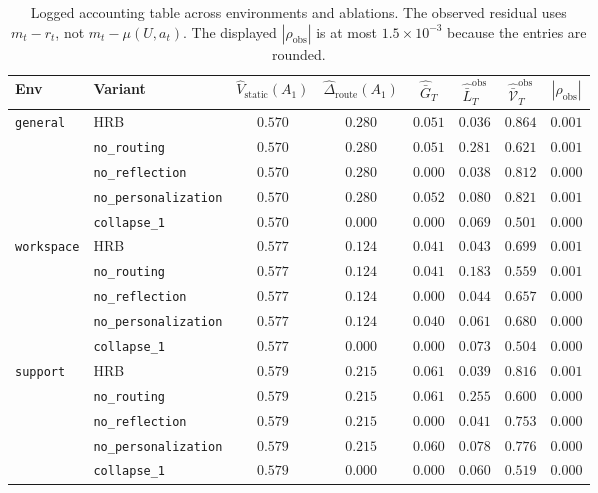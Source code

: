 \documentclass{article} %
\begin{document}
\begin{table}[h]
\centering
\small
\setlength{\tabcolsep}{4pt}
\begin{tabular}{llcccccc}
\toprule
Env & Variant & $\widehat V_{\mathrm{static}}(A_1)$ & $\widehat\Delta_{\mathrm{route}}(A_1)$ & $\widehat{\bar G}_T$ & $\widehat{\bar L}_T^{\mathrm{obs}}$ & $\widehat{\bar{\mathcal V}}_T^{\mathrm{obs}}$ & $|\rho_{\mathrm{obs}}|$ \\
\midrule
\multirow{5}{*}{\texttt{general}}
 & \textnormal{HRB}                & $0.570$ & $0.280$ & $0.051$ & $0.036$ & $0.864$ & $0.001$ \\
 & \texttt{no\_routing}         & $0.570$ & $0.280$ & $0.051$ & $0.281$ & $0.621$ & $0.001$ \\
 & \texttt{no\_reflection}      & $0.570$ & $0.280$ & $0.000$ & $0.038$ & $0.812$ & $0.000$ \\
 & \texttt{no\_personalization} & $0.570$ & $0.280$ & $0.052$ & $0.080$ & $0.821$ & $0.001$ \\
 & \texttt{collapse\_1}         & $0.570$ & $0.000$ & $0.000$ & $0.069$ & $0.501$ & $0.000$ \\
\midrule
\multirow{5}{*}{\texttt{workspace}}
 & \textnormal{HRB}                & $0.577$ & $0.124$ & $0.041$ & $0.043$ & $0.699$ & $0.001$ \\
 & \texttt{no\_routing}         & $0.577$ & $0.124$ & $0.041$ & $0.183$ & $0.559$ & $0.001$ \\
 & \texttt{no\_reflection}      & $0.577$ & $0.124$ & $0.000$ & $0.044$ & $0.657$ & $0.000$ \\
 & \texttt{no\_personalization} & $0.577$ & $0.124$ & $0.040$ & $0.061$ & $0.680$ & $0.000$ \\
 & \texttt{collapse\_1}         & $0.577$ & $0.000$ & $0.000$ & $0.073$ & $0.504$ & $0.000$ \\
\midrule
\multirow{5}{*}{\texttt{support}}
 & \textnormal{HRB}                & $0.579$ & $0.215$ & $0.061$ & $0.039$ & $0.816$ & $0.001$ \\
 & \texttt{no\_routing}         & $0.579$ & $0.215$ & $0.061$ & $0.255$ & $0.600$ & $0.000$ \\
 & \texttt{no\_reflection}      & $0.579$ & $0.215$ & $0.000$ & $0.041$ & $0.753$ & $0.000$ \\
 & \texttt{no\_personalization} & $0.579$ & $0.215$ & $0.060$ & $0.078$ & $0.776$ & $0.000$ \\
 & \texttt{collapse\_1}         & $0.579$ & $0.000$ & $0.000$ & $0.060$ & $0.519$ & $0.000$ \\
\bottomrule
\end{tabular}
\caption{Logged accounting table across environments and ablations. The
observed residual uses \(m_t-r_t\), not \(m_t-\mu(U,a_t)\). The displayed
\(|\rho_{\mathrm{obs}}|\) is at most \(1.5\times10^{-3}\) because the entries
are rounded.}
\label{tab:app-decomp-full}
\end{table}
\end{document}
